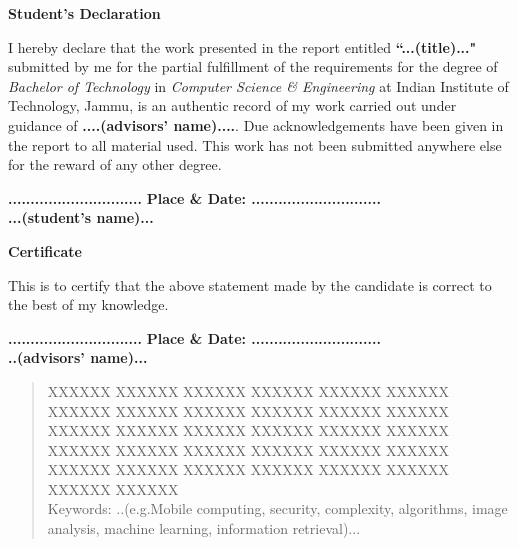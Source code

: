 \documentclass[letterpaper,11pt]{report}
\begin{document}


%

\newpage

\begin{center}
\textbf{\Large Student's Declaration}\label{section:declaration}
\end{center}
I hereby declare that the work presented in the report entitled \textbf{``...(title)..."} submitted by me for the partial fulfillment of the requirements for the degree of \emph{Bachelor of Technology} in \emph{Computer Science \& Engineering} at
 Indian Institute of Technology, Jammu, is an authentic record of my work carried out under guidance of \textbf{....(advisors' name)....}. Due acknowledgements have  been given in the report to all material used. This work has not been submitted anywhere else for the reward of any other degree.
 \\ \vspace{0.5in}

\textbf{..............................}\hfill
\textbf{ Place \& Date: .............................} \\
\textbf{...(student's name)...}




\vspace{3in}
\begin{center}
\textbf{\Large Certificate} \label{section:certificate}
\end{center}
This is to certify that the above statement made by the candidate is correct to the best of my knowledge.
 \\ \vspace{0.4in}

\textbf{..............................}\hfill
\textbf{ Place \& Date: .............................} \\
\textbf{..(advisors' name)...}\\



\pagebreak

\begin{abstract}

XXXXXX XXXXXX XXXXXX XXXXXX XXXXXX XXXXXX XXXXXX XXXXXX XXXXXX XXXXXX XXXXXX XXXXXX XXXXXX XXXXXX XXXXXX XXXXXX XXXXXX XXXXXX XXXXXX XXXXXX XXXXXX XXXXXX XXXXXX XXXXXX XXXXXX XXXXXX XXXXXX XXXXXX XXXXXX XXXXXX XXXXXX XXXXXX  \\

\vspace{2in}
Keywords: ..(e.g.Mobile computing, security, complexity, algorithms, image analysis, machine learning, information retrieval)...
\end{abstract}
\end{document}

